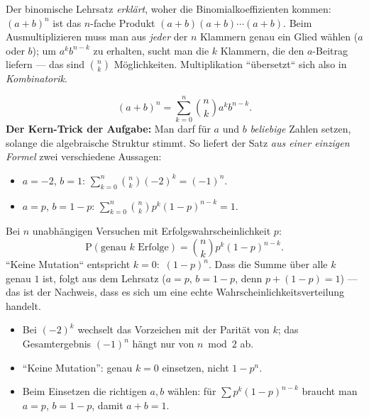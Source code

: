 


Der binomische Lehrsatz \emph{erklärt}, woher die Binomialkoeffizienten
kommen: $(a+b)^n$ ist das $n$-fache Produkt $(a+b)(a+b)\cdots(a+b)$. Beim
Ausmultiplizieren muss man aus \emph{jeder} der $n$ Klammern genau ein
Glied wählen ($a$ oder $b$); um $a^k b^{n-k}$ zu erhalten, sucht man die
$k$ Klammern, die den $a$-Beitrag liefern --- das sind
$\binom{n}{k}$ Möglichkeiten. Multiplikation ``übersetzt`` sich also in
\emph{Kombinatorik}.

\begin{werkzeugkasten}
\begin{equation}
  (a+b)^n=\sum_{k=0}^{n}\binom{n}{k}a^k b^{n-k}.
\end{equation}
\textbf{Der Kern-Trick der Aufgabe:} Man darf für $a$ und $b$
\emph{beliebige} Zahlen setzen, solange die algebraische Struktur stimmt.
So liefert der Satz \emph{aus einer einzigen Formel} zwei verschiedene
Aussagen:
\begin{itemize}
  \item $a=-2$, $b=1$: $\sum_{k=0}^{n}\binom{n}{k}(-2)^k=(-1)^n$.
  \item $a=p$, $b=1-p$: $\sum_{k=0}^{n}\binom{n}{k}p^k (1-p)^{n-k}=1$.
\end{itemize}
\end{werkzeugkasten}

\begin{werkzeugkasten}[Binomialverteilung]
Bei $n$ unabhängigen Versuchen mit Erfolgswahrscheinlichkeit $p$:
\begin{equation}
  \mathrm P(\text{genau }k\text{ Erfolge})=\binom{n}{k}p^k(1-p)^{n-k}.
\end{equation}
``Keine Mutation`` entspricht $k=0$: $\,(1-p)^{n}$. Dass die Summe über
alle $k$ genau $1$ ist, folgt aus dem Lehrsatz ($a=p$, $b=1-p$, denn
$p+(1-p)=1$) --- das ist der Nachweis, dass es sich um eine echte
Wahrscheinlichkeitsverteilung handelt.
\end{werkzeugkasten}

\begin{achtung}
\begin{itemize}
  \item Bei $(-2)^k$ wechselt das Vorzeichen mit der Parität von $k$;
        das Gesamtergebnis $(-1)^n$ hängt nur von $n\bmod2$ ab.
  \item ``Keine Mutation'': genau $k=0$ einsetzen, nicht $1-p^n$.
  \item Beim Einsetzen die richtigen $a,b$ wählen: für
        $\sum p^k(1-p)^{n-k}$ braucht man $a=p$, $b=1-p$, damit
        $a+b=1$.
\end{itemize}
\end{achtung}
